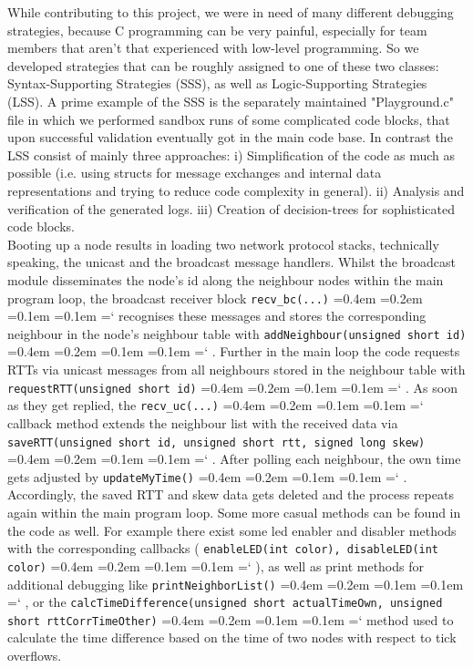 \documentclass{llncs}
\newcommand{\code}[1]{%
	\texttt{#1}%
	\fontdimen2\font=0.4em
	\fontdimen3\font=0.2em
	\fontdimen4\font=0.1em
	\fontdimen7\font=0.1em
	\hyphenchar\font=`\-
}
\begin{document}
	\noindent While contributing to this project, we were in need of many different debugging strategies, because C programming can be very painful, especially for team members that aren't that experienced with low-level programming.
	So we developed strategies that can be roughly assigned to one of these two classes: Syntax-Supporting Strategies (SSS), as well as Logic-Supporting Strategies (LSS). 
	A prime example of the SSS is the separately maintained "Playground.c" file in which we performed sandbox runs of some complicated code blocks, that upon successful validation eventually got in the main code base.
	In contrast the LSS consist of mainly three approaches: i) Simplification of the code as much as possible (i.e. using structs for message exchanges and internal data representations and trying to reduce code complexity in general). ii) Analysis and verification of the generated logs. iii) Creation of decision-trees for sophisticated code blocks.\\
	Booting up a node results in loading two network protocol stacks, technically speaking, the unicast and the broadcast message handlers. Whilst the broadcast module disseminates the node's id along the neighbour nodes within the main program loop, the broadcast receiver block \code{recv\_bc(...)} recognises these messages and stores the corresponding neighbour in the node's neighbour table with \code{addNeighbour(unsigned short id)}. Further in the main loop the code requests RTTs via unicast messages from all neighbours stored in the neighbour table with \code{requestRTT(unsigned short id)}. As soon as they get replied, the \code{recv\_uc(...)} callback method extends the neighbour list with the received data via \code{saveRTT(unsigned short id, unsigned short rtt, signed long skew)}.
	After polling each neighbour, the own time gets adjusted by \code{updateMyTime()}. Accordingly, the saved RTT and skew data gets deleted and the process repeats again within the main program loop.
	Some more casual methods can be found in the code as well. For example there exist some led enabler and disabler methods with the corresponding callbacks (\code{enableLED(int color), disableLED(int color)}), as well as print methods for additional debugging like \code{print\-Neighbor\-List()}, or the \code{calcTimeDifference(unsigned short actualTimeOwn, un\-sign\-ed short rttCorrTimeOther)} method used to calculate the time difference based on the time of two nodes with respect to tick overflows.
	
\end{document}

